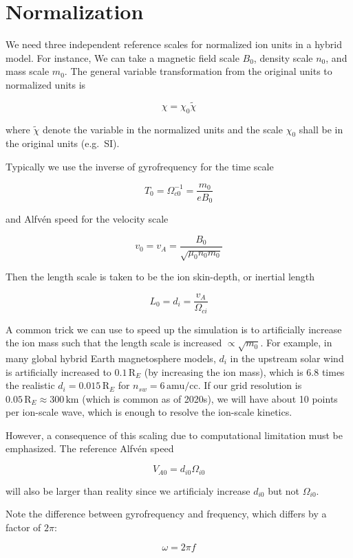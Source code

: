 \documentclass[
  notoc %
]{tufte-book}
\begin{document}
\hypertarget{normalization-1}{%
\section{Normalization}\label{normalization-1}}

We need three independent reference scales for normalized ion units in a
hybrid model. For instance, We can take a magnetic field scale \(B_0\),
density scale \(n_0\), and mass scale \(m_0\). The general variable
transformation from the original units to normalized units is

\[
\chi = \chi_0\tilde{\chi}
\]

where \(\tilde{\chi}\) denote the variable in the normalized units and
the scale \(\chi_0\) shall be in the original units (e.g.~SI).

Typically we use the inverse of gyrofrequency for the time scale

\[
T_0 = \Omega_{c0}^{-1} = \frac{m_0}{e B_0}
\]

and Alfvén speed for the velocity scale

\[
v_0 = v_A = \frac{B_0}{\sqrt{\mu_0 n_0 m_0}}
\]

Then the length scale is taken to be the ion skin-depth, or inertial
length

\[
L_0 = d_i = \frac{v_A}{\Omega_{ci}}
\]

A common trick we can use to speed up the simulation is to artificially
increase the ion mass such that the length scale is increased
\(\propto \sqrt{m_0}\). For example, in many global hybrid Earth
magnetosphere models, \(d_i\) in the upstream solar wind is artificially
increased to \(0.1\,\text{R}_E\) (by increasing the ion mass), which is
6.8 times the realistic \(d_i=0.015\,\text{R}_E\) for
\(n_{sw}=6\,\text{amu/cc}\). If our grid resolution is
\(0.05\,\text{R}_E\approx 300\,\text{km}\) (which is common as of
2020s), we will have about 10 points per ion-scale wave, which is enough
to resolve the ion-scale kinetics.

However, a consequence of this scaling due to computational limitation
must be emphasized. The reference Alfvén speed

\[
V_{A0} = d_{i0}\Omega_{i0}
\]

will also be larger than reality since we artificialy increase
\(d_{i0}\) but not \(\Omega_{i0}\).

Note the difference between gyrofrequency and frequency, which differs
by a factor of \(2\pi\):

\[
\omega = 2\pi f
\]
\end{document}
